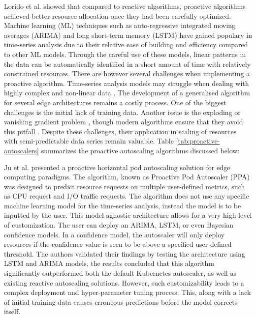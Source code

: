 Lorido et al. \cite{lorido2014review} showed that compared to reactive algorithms, proactive algorithms achieved better resource allocation once they had been carefully optimized. Machine learning (ML) techniques such as auto-regressive integrated moving averages (ARIMA) and long short-term memory (LSTM) have gained populary in time-series analysis due to their relative ease of building and efficiency compared to other ML models. Through the careful use of these models, linear patterns in the data can be automatically identified in a short amount of time with relatively constrained resources. There are however several challenges when implementing a proactive algorithm. Time-series analysis models may struggle when dealing with highly complex and non-linear data \cite{dogani2023auto}. The development of a generalised algorithm for several edge architectures remains a costly process. One of the biggest challenges is the initial lack of training data. Another issue is the exploding or vanishing gradient problem \cite{pascanu2013difficulty}, though modern algorithms ensure that they avoid this pitfall \cite{hochreiter2001gradient}. Despite these challenges, their application in scaling of resources with semi-predictable data series remain valuable. Table \ref{tab:proactive-autoscalers} summarizes the proactive autoscaling algorithms discussed below:\par

Ju et al. \cite{ju2021proactive} presented a proactive horizontal pod autoscaling solution for edge computing paradigms. The algorithm, known as Proactive Pod Autoscaler (PPA) was designed to predict resource requests on multiple user-defined metrics, such as CPU request and I/O traffic requests. The algorithm does not use any specific machine learning model for the time-series analysis, instead the model is to be inputted by the user. This model agnostic architecture allows for a very high level of customization. The user can deploy an ARIMA, LSTM, or even Bayesian confidence models. In a confidence model, the autoscaler will only deploy resources if the confidence value is seen to be above a specified user-defined threshold. The authors validated their findings by testing the architecture using LSTM and ARIMA models, the results concluded that this algorithm significantly outperformed both the default Kubernetes autoscaler, as well as existing reactive autoscaling solutions. However, such customizability leads to a complex deployment and hyper-parameter tuning process. This, along with a lack of initial training data causes erroneous predictions before the model corrects itself.\par

